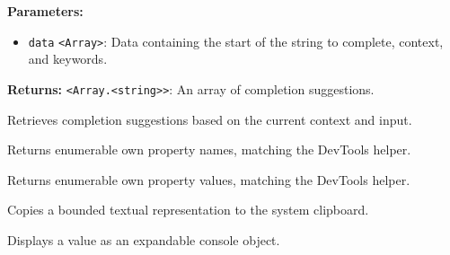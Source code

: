 \documentclass[12pt,a4paper]{article}
\begin{document}
\vspace{5mm}
\noindent {}


\noindent \textbf{Parameters:}
\begin{itemize}
  \item \texttt{data} \texttt{<Array>}: Data containing the start of the string to complete, context, and keywords.
\end{itemize}

\noindent \textbf{Returns:} \texttt{<Array.<string>>}: An array of completion suggestions.

\noindent Retrieves completion suggestions based on the current context and input.

\vspace{5mm}
\noindent {}


\noindent Returns enumerable own property names, matching the DevTools helper.

\vspace{5mm}
\noindent {}


\noindent Returns enumerable own property values, matching the DevTools helper.

\vspace{5mm}
\noindent {}


\noindent Copies a bounded textual representation to the system clipboard.

\vspace{5mm}
\noindent {}


\noindent Displays a value as an expandable console object.

\vspace{5mm}
\noindent {}
\end{document}
